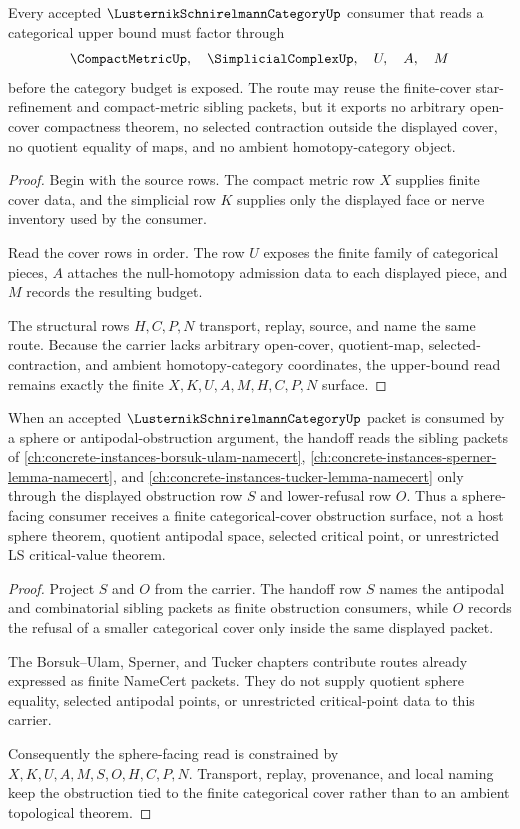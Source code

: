 \begin{theorem}
\label{thm:lusternik-schnirelmann-category-finite-cover-route}
Every accepted $\LusternikSchnirelmannCategoryUp$ consumer that reads a categorical upper bound must factor through
$$
\CompactMetricUp,\quad \SimplicialComplexUp,\quad U,\quad A,\quad M
$$
before the category budget is exposed. The route may reuse the finite-cover star-refinement and compact-metric sibling packets, but it exports no arbitrary open-cover compactness theorem, no selected contraction outside the displayed cover, no quotient equality of maps, and no ambient homotopy-category object.
\end{theorem}
\begin{proof}
Begin with the source rows. The compact metric row $X$ supplies finite cover data, and the simplicial row $K$ supplies only the displayed face or nerve inventory used by the consumer.

Read the cover rows in order. The row $U$ exposes the finite family of categorical pieces, $A$ attaches the null-homotopy admission data to each displayed piece, and $M$ records the resulting budget.

The structural rows $H,C,P,N$ transport, replay, source, and name the same route. Because the carrier lacks arbitrary open-cover, quotient-map, selected-contraction, and ambient homotopy-category coordinates, the upper-bound read remains exactly the finite $X,K,U,A,M,H,C,P,N$ surface.
\end{proof}

\begin{theorem}
\label{thm:lusternik-schnirelmann-category-sphere-consumer-handoff}
When an accepted $\LusternikSchnirelmannCategoryUp$ packet is consumed by a sphere or antipodal-obstruction argument, the handoff reads the sibling packets of \autoref{ch:concrete-instances-borsuk-ulam-namecert}, \autoref{ch:concrete-instances-sperner-lemma-namecert}, and \autoref{ch:concrete-instances-tucker-lemma-namecert} only through the displayed obstruction row $S$ and lower-refusal row $O$. Thus a sphere-facing consumer receives a finite categorical-cover obstruction surface, not a host sphere theorem, quotient antipodal space, selected critical point, or unrestricted LS critical-value theorem.
\end{theorem}
\begin{proof}
Project $S$ and $O$ from the carrier. The handoff row $S$ names the antipodal and combinatorial sibling packets as finite obstruction consumers, while $O$ records the refusal of a smaller categorical cover only inside the same displayed packet.

The Borsuk--Ulam, Sperner, and Tucker chapters contribute routes already expressed as finite NameCert packets. They do not supply quotient sphere equality, selected antipodal points, or unrestricted critical-point data to this carrier.

Consequently the sphere-facing read is constrained by $X,K,U,A,M,S,O,H,C,P,N$. Transport, replay, provenance, and local naming keep the obstruction tied to the finite categorical cover rather than to an ambient topological theorem.
\end{proof}

